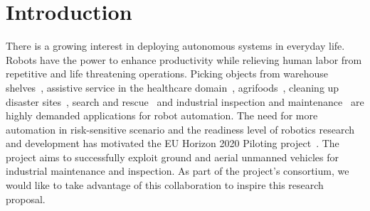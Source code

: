\section{Introduction}
\label{sec:Introduction}


There is a growing interest in deploying autonomous systems in everyday life. Robots have the power to enhance productivity while relieving human labor from repetitive and life threatening operations. Picking objects from warehouse shelves~\cite{correll2016analysis}, assistive service in the healthcare domain~\cite{cooper2020ari}, agrifoods~\cite{duckett2018agricultural}, cleaning up disaster sites~\cite{nishikawa2019disaster}, search and rescue~\cite{negrello2018walk} and industrial inspection and maintenance~\cite{lattanzi2017review} are highly demanded applications for robot automation. The need for more automation in risk-sensitive scenario and the readiness level of robotics research and development has motivated the EU Horizon 2020 Piloting project~\cite{eu-piloting-2020}. The project aims to successfully exploit ground and aerial unmanned vehicles for industrial maintenance and inspection. As part of the project's consortium, we would like to take advantage of this collaboration to inspire this research proposal.     

